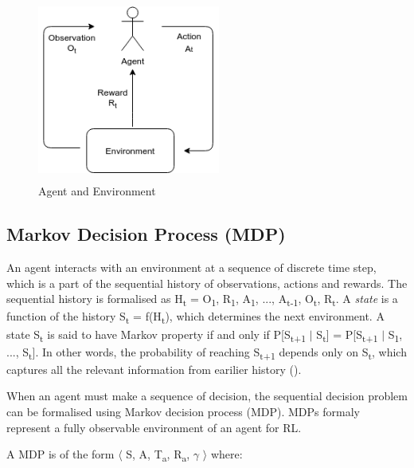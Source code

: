 \documentclass[12pt,twoside]{report}
\begin{document}
\begin{figure}[!htb]
\centering
\includegraphics[width=6cm, height=6cm]{./figures/agent_env}
\caption{Agent and Environment}
\label{agent_env}
\end{figure}


\subsection{Markov Decision Process (MDP)}
An agent interacts with an environment at a sequence of discrete time step, which is a part of the sequential history of observations, actions and rewards. The sequential history is formalised as H\textsubscript{t} = O\textsubscript{1}, R\textsubscript{1}, A\textsubscript{1}, ..., A\textsubscript{t-1}, O\textsubscript{t}, R\textsubscript{t}.  A \textit{state} is a function of the history S\textsubscript{t} = f(H\textsubscript{t}), which determines the next environment.  A state S\textsubscript{t} is said to have Markov property if and only if
P[S\textsubscript{t+1} $\vert$ S\textsubscript{t}] = P[S\textsubscript{t+1} $\vert$ S\textsubscript{1}, ..., S\textsubscript{t}]. In other words, the probability of reaching S\textsubscript{t+1} depends only on S\textsubscript{t}, which captures all the relevant information from earilier history (\cite{Puterman1994}).

When an agent must make a sequence of decision, the sequential decision problem can be formalised using Markov decision process (MDP). MDPs formaly represent a fully observable environment of an agent for RL.

A MDP is of the form $\langle$ S, A, T\textsubscript{a}, R\textsubscript{a}, $\gamma$ $\rangle$ where:
\end{document}

